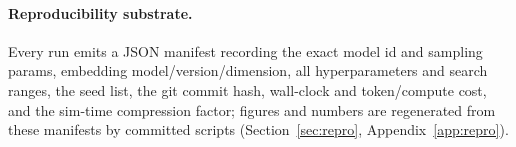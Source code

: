 \paragraph{Reproducibility substrate.} Every run emits a JSON manifest recording
the exact model id and sampling params, embedding model/version/dimension, all
hyperparameters and search ranges, the seed list, the git commit hash,
wall-clock and token/compute cost, and the sim-time compression factor; figures
and numbers are regenerated from these manifests by committed scripts
(Section~\ref{sec:repro}, Appendix~\ref{app:repro}).
